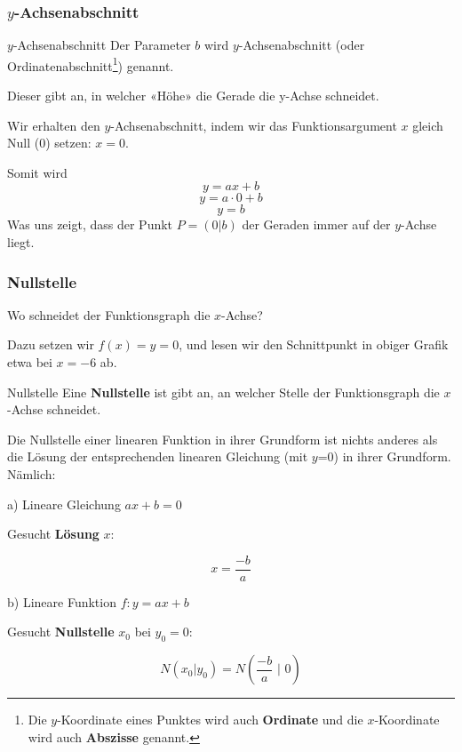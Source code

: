 \newpage

\subsubsection{$y$-Achsenabschnitt}
\begin{definition}{$y$-Achsenabschnitt}{}
  Der Parameter $b$ wird $y$-Achsenabschnitt
(oder Ordinatenabschnitt\footnote{Die
    $y$-Koordinate eines Punktes wird auch
    \textbf{Ordinate} und die $x$-Koordinate wird auch
    \textbf{Abszisse}  genannt.}) genannt.
  
Dieser gibt an, in welcher «Höhe» die Gerade die y-Achse schneidet.
\end{definition}

Wir erhalten den $y$-Achsenabschnitt, indem wir das Funktionsargument $x$
gleich Null (0) setzen: $x=0$.

Somit wird
$$y=ax+b$$
$$y=a\cdot{}0+b$$
$$y=b$$
Was uns zeigt, dass der  Punkt $P=(0|b)$ der Geraden immer auf der $y$-Achse liegt.

\newpage


\subsubsection{Nullstelle}
Wo schneidet der Funktionsgraph die $x$-Achse?

Dazu setzen wir $f(x)=y=0$, und lesen wir den Schnittpunkt in obiger Grafik etwa bei $x=-6$ ab.

\begin{definition}{Nullstelle}{}
  Eine \textbf{Nullstelle} ist gibt an, an welcher Stelle der Funktionsgraph die $x$-Achse schneidet.
\end{definition}

Die Nullstelle einer linearen Funktion in ihrer Grundform ist nichts
anderes als die Lösung der entsprechenden linearen Gleichung (mit
$y$=0) in ihrer Grundform. Nämlich:

a) Lineare Gleichung $ax+b=0$

Gesucht \textbf{Lösung} $x$:

$$x = \frac{-b}{a}  $$

b) Lineare Funktion $f: y=ax+b$

Gesucht \textbf{Nullstelle} $x_0$ bei $y_0=0$:

$$N(x_0|y_0) = N\left( \frac{-b}{a}\,\, \bigg|\,\, 0 \right) $$


